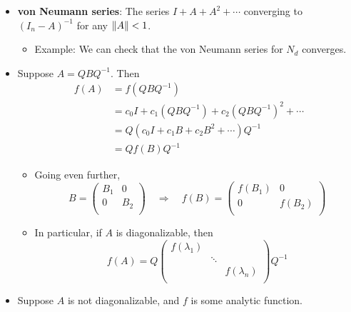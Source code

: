 \documentclass[../notes.tex]{subfiles}
\begin{document}
\begin{itemize}
\begin{itemize}
    \end{itemize}
    \item \textbf{von Neumann series}: The series $I+A+A^2+\cdots$ converging to $(I_n-A)^{-1}$ for any $\norm{A}<1$.
    \begin{itemize}
        \item Example: We can check that the von Neumann series for $N_d$ converges.
    \end{itemize}
    \item Suppose $A=QBQ^{-1}$. Then
    \begin{align*}
        f(A) &= f(QBQ^{-1})\\
        &= c_0I+c_1(QBQ^{-1})+c_2(QBQ^{-1})^2+\cdots\\
        &= Q(c_0I+c_1B+c_2B^2+\cdots)Q^{-1}\\
        &= Qf(B)Q^{-1}
    \end{align*}
    \begin{itemize}
        \item Going even further,
        \begin{equation*}
            B =
            \begin{pmatrix}
                B_1 & 0\\
                0 & B_2\\
            \end{pmatrix}
            \quad\Longrightarrow\quad
            f(B) =
            \begin{pmatrix}
                f(B_1) & 0\\
                0 & f(B_2)\\
            \end{pmatrix}
        \end{equation*}
        \item In particular, if $A$ is diagonalizable, then
        \begin{equation*}
            f(A) = Q
            \begin{pmatrix}
                f(\lambda_1) &  & \\
                 & \ddots & \\
                 &  & f(\lambda_n)\\
            \end{pmatrix}
            Q^{-1}
        \end{equation*}
    \end{itemize}
    \item Suppose $A$ is not diagonalizable, and $f$ is some analytic function.

\end{itemize}
\end{document}
